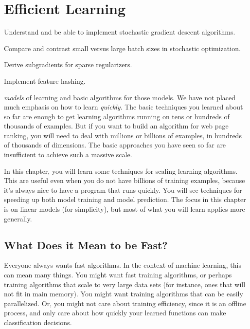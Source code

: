 \chapter{Efficient Learning} \label{sec:opt}

\chapterquote{}{}

\begin{learningobjectives}
\item Understand and be able to implement stochastic gradient descent
  algorithms.
\item Compare and contrast small versus large batch sizes in
  stochastic optimization.
\item Derive subgradients for sparse regularizers.
\item Implement feature hashing.
\end{learningobjectives}

\dependencies{}

 \emph{models} of learning
and basic algorithms for those models.  We have not placed much
emphasis on how to learn \emph{quickly}.  The basic techniques you
learned about so far are enough to get learning algorithms running on
tens or hundreds of thousands of examples.  But if you want to build
an algorithm for web page ranking, you will need to deal with millions
or billions of examples, in hundreds of thousands of dimensions.  The
basic approaches you have seen so far are insufficient to achieve such
a massive scale.

In this chapter, you will learn some techniques for scaling learning
algorithms.  This are useful even when you do not have billions of
training examples, because it's always nice to have a program that
runs quickly.  You will see techniques for speeding up both model
training and model prediction.  The focus in this chapter is on linear
models (for simplicity), but most of what you will learn applies more
generally.

\section{What Does it Mean to be Fast?}

Everyone always wants fast algorithms.  In the context of machine
learning, this can mean many things.  You might want fast training
algorithms, or perhaps training algorithms that scale to very large
data sets (for instance, ones that will not fit in main memory).  You
might want training algorithms that can be easily parallelized.  Or,
you might not care about training efficiency, since it is an offline
process, and only care about how quickly your learned functions can
make classification decisions.

